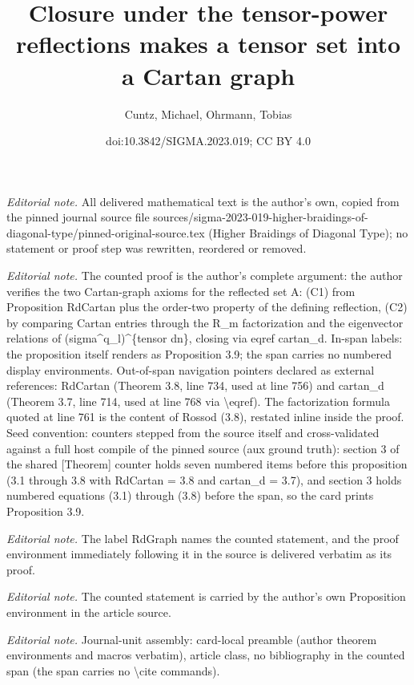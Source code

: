 \documentclass[10pt,a4paper]{article}
\title{Closure under the tensor-power reflections makes a tensor set into a Cartan graph}
\author{Cuntz, Michael, Ohrmann, Tobias}
\date{doi:10.3842/SIGMA.2023.019; CC BY 4.0}
\numberwithin{equation}{section}
\begin{document}
\maketitle
\setcounter{section}{3}
\setcounter{Theorem}{8}
\setcounter{equation}{8}
\noindent\textit{Editorial note.} All delivered mathematical text is the author's own, copied from the pinned journal source file sources/sigma-2023-019-higher-braidings-of-diagonal-type/pinned-original-source.tex (Higher Braidings of Diagonal Type); no statement or proof step was rewritten, reordered or removed.\par\medskip
\noindent\textit{Editorial note.} The counted proof is the author's complete argument: the author verifies the two Cartan-graph axioms for the reflected set A: (C1) from Proposition RdCartan plus the order-two property of the defining reflection, (C2) by comparing Cartan entries through the R\_m factorization and the eigenvector relations of (sigma\textasciicircum{}q\_l)\textasciicircum{}\{tensor dn\}, closing via eqref cartan\_d. In-span labels: the proposition itself renders as Proposition 3.9; the span carries no numbered display environments. Out-of-span navigation pointers declared as external references: RdCartan (Theorem 3.8, line 734, used at line 756) and cartan\_d (Theorem 3.7, line 714, used at line 768 via \textbackslash{}eqref). The factorization formula quoted at line 761 is the content of Rossod (3.8), restated inline inside the proof. Seed convention: counters stepped from the source itself and cross-validated against a full host compile of the pinned source (aux ground truth): section 3 of the shared [Theorem] counter holds seven numbered items before this proposition (3.1 through 3.8 with RdCartan = 3.8 and cartan\_d = 3.7), and section 3 holds numbered equations (3.1) through (3.8) before the span, so the card prints Proposition 3.9.\par\medskip
\noindent\textit{Editorial note.} The label RdGraph names the counted statement, and the proof environment immediately following it in the source is delivered verbatim as its proof.\par\medskip
\noindent\textit{Editorial note.} The counted statement is carried by the author's own Proposition environment in the article source.\par\medskip
\noindent\textit{Editorial note.} Journal-unit assembly: card-local preamble (author theorem environments and macros verbatim), article class, no bibliography in the counted span (the span carries no \textbackslash{}cite commands).\par\medskip
\end{document}

